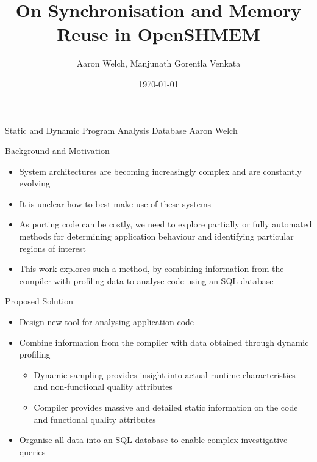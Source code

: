 \documentclass[final]{beamer}
\title{On Synchronisation and Memory Reuse in OpenSHMEM}
\author{Aaron Welch\inst{1}, Manjunath Gorentla Venkata\inst{1}}
\institute{Extreme Scale Systems Center\\
Oak Ridge National Laboratory\\
\email{\{welchda, manjugv\}@ornl.gov}
}
\date{\today}
\let\olditem\item
\renewcommand{\item}{\vspace{\fill}\olditem}
\begin{document}
\begin{frame}{\hspace{0.02\paperwidth}Static and Dynamic Program Analysis Database}
Aaron Welch %
\end{frame}

\begin{frame}{\hspace{0.02\paperwidth}Background and Motivation}
\begin{itemize}
\item System architectures are becoming increasingly complex and are constantly evolving
\item It is unclear how to best make use of these systems
\item As porting code can be costly, we need to explore partially or fully automated methods for determining application behaviour and identifying particular regions of interest
\item This work explores such a method, by combining information from the compiler with profiling data to analyse code using an \acs{SQL} database
\end{itemize}
\end{frame}

\begin{frame}{\hspace{0.02\paperwidth}Proposed Solution}
\begin{itemize}
\item Design new tool for analysing application code
\item Combine information from the compiler with data obtained through dynamic profiling
\begin{itemize}
\item Dynamic sampling provides insight into actual runtime characteristics and non-functional quality attributes
\item Compiler provides massive and detailed static information on the code and functional quality attributes
\end{itemize}
\item Organise all data into an \acs{SQL} database to enable complex investigative queries
\end{itemize}
\end{frame}
\end{document}
